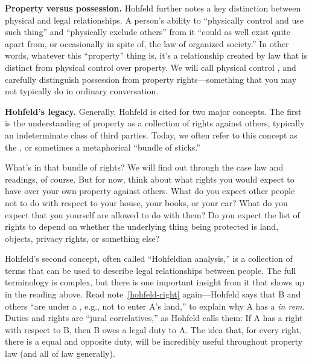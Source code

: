 \item \textbf{Property versus possession.}
Hohfeld further notes a key distinction between physical and legal
relationships. A person's ability to ``physically control and use such thing''
and ``physically exclude others'' from it ``could as well exist quite apart
from, or occasionally in spite of, the law of organized society.'' In other
words, whatever this ``property'' thing is, it's a relationship created by law
that is distinct from physical control over property. We will call physical
control , and carefully distinguish possession from property
rights---something that you may not typically do in ordinary conversation.


\item \textbf{Hohfeld's legacy.} Generally, Hohfeld is cited for two major
concepts. The first is the understanding of property as a collection of rights
against others, typically an indeterminate class of third parties. Today, we
often refer to this concept as the , or sometimes a
metaphorical ``bundle of sticks.''

What's in that bundle of rights? We will find out through the case law and
readings, of course. But for now, think about what rights you would expect to
have over your own property against others. What do you expect other people not
to do with respect to your house, your books, or your car? What do you expect
that you yourself are allowed to do with them? Do you expect the list of rights
to depend on whether the underlying thing being protected is land, objects,
privacy rights, or something else?

Hohfeld's second concept, often called ``Hohfeldian analysis,'' is a collection
of terms that can be used to describe legal relationships between people. The
full terminology is complex, but there is one important insight from it that
shows up in the reading above. Read note~\ref{hohfeld-right} again---Hohfeld
says that B and others ``are under a , e.g., not to enter A's land,''
to explain why A has a  \emph{in rem}. Duties and rights are ``jural
correlatives,'' as Hohfeld calls them: If A has a right with respect to B, then
B owes a legal duty to A\@. The idea that, for every right, there is a equal and
opposite duty, will be incredibly useful throughout property law (and all of law
generally).
